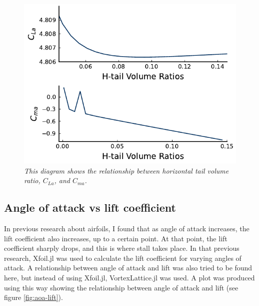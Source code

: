 \documentclass{journal}
\begin{document}
	\begin{figure}
		\centering
		\includegraphics{../graphics/htail-stability.pdf}
		\caption{\emph{This diagram shows the relationship between horizontal tail volume ratio, \(C_{La}\), and \(C_{ma}\).}}
		\label{fig:htail-stability}
	\end{figure}
	
	\subsection{Angle of attack vs lift coefficient}
	
	In previous research about airfoils, I found that as angle of attack increases, the lift coefficient also increases, up to a certain point. At that point, the lift coefficient sharply drops, and this is where stall takes place. In that previous research, Xfoil.jl was used to calculate the lift coefficient for varying angles of attack. A relationship between angle of attack and lift was also tried to be found here, but instead of using Xfoil.jl, VortexLattice.jl was used. A plot was produced using this way showing the relationship between angle of attack and lift (see figure \ref{fig:aoa-lift}). \\
	
\end{document}
